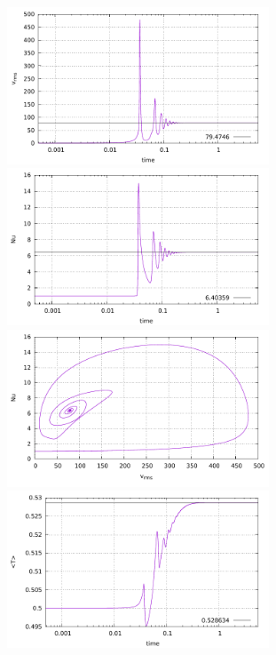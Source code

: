 \begin{center}
\includegraphics[width=7.8cm]{python_codes/fieldstone_28/results_case4/vrms.pdf}
\includegraphics[width=7.8cm]{python_codes/fieldstone_28/results_case4/Nu.pdf}\\
\includegraphics[width=7.8cm]{python_codes/fieldstone_28/results_case4/vrms_Nu.pdf}
\includegraphics[width=7.8cm]{python_codes/fieldstone_28/results_case4/Tavrg.pdf}
\end{center}

